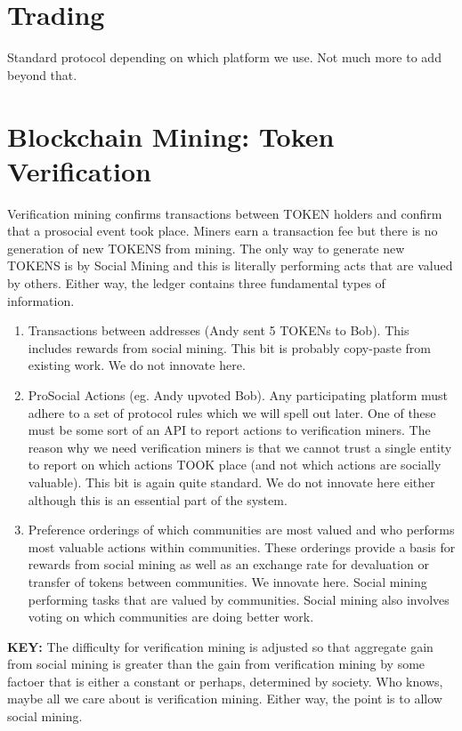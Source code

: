 \section*{Trading}

Standard protocol depending on which platform we use. Not much more to add beyond that.

\section*{Blockchain Mining: Token Verification}

Verification mining confirms transactions between TOKEN holders and confirm that a prosocial event took place. Miners earn a transaction fee but there is no generation of new TOKENS from mining. The only way to generate new TOKENS is by Social Mining and this is literally performing acts that are valued by others. Either way, the ledger contains three fundamental types of information.

\begin{enumerate}
	\item Transactions between addresses (Andy sent 5 TOKENs to Bob). This includes rewards from social mining. This bit is probably copy-paste from existing work. We do not innovate here.
	
	\item ProSocial Actions (eg. Andy upvoted Bob). Any participating platform must adhere to a set of protocol rules which we will spell out later. One of these must be some sort of an API to report actions to verification miners. The reason why we need verification miners is that we cannot trust a single entity to report on which actions TOOK place (and not which actions are socially valuable). This bit is again quite standard. We do not innovate here either although this is an essential part of the system.
	
	\item Preference orderings of which communities are most valued and who performs most valuable actions within communities. These orderings provide a basis for rewards from social mining as well as an exchange rate for devaluation or transfer of tokens between communities. We innovate here. Social mining performing tasks that are valued by communities. Social mining also involves voting on which communities are doing better work. 
	
\end{enumerate}

\textbf{KEY:} The difficulty for verification mining is adjusted so that aggregate gain from social mining is greater than the gain from verification mining by some factoer that is either a constant or perhaps, determined by society. Who knows, maybe all we care about is verification mining. Either way, the point is to allow social mining.

